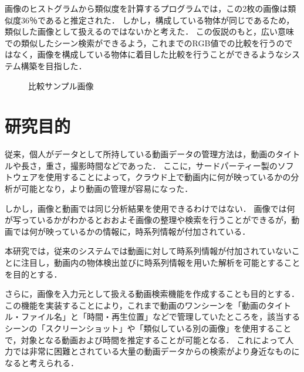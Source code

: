 \documentclass[a4j,12pt,dvipdfmx]{jreport}
\begin{document}
画像のヒストグラムから類似度を計算するプログラムでは，この2枚の画像は類似度36％であると推定された．
しかし，構成している物体が同じであるため，類似した画像として扱えるのではないかと考えた．
この仮説のもと，広い意味での類似したシーン検索ができるよう，これまでのRGB値での比較を行うのではなく，画像を構成している物体に着目した比較を行うことができるようなシステム構築を目指した．

\vspace{2zh}
\begin{figure}[H]
  \centering
  \caption{\label{fig:hikaku} 比較サンプル画像}
\end{figure}

\section{研究目的}
従来，個人がデータとして所持している動画データの管理方法は，動画のタイトルや長さ，重さ，撮影時間などであった．
ここに，サードパーティー製のソフトウェアを使用することによって，クラウド上で動画内に何が映っているかの分析が可能となり，より動画の管理が容易になった．

しかし，画像と動画では同じ分析結果を使用できるわけではない．
画像では何が写っているかがわかるとおおよそ画像の整理や検索を行うことができるが，動画では何が映っているかの情報に，時系列情報が付加されている．

本研究では，従来のシステムでは動画に対して時系列情報が付加されていないことに注目し，動画内の物体検出並びに時系列情報を用いた解析を可能とすることを目的とする．

さらに，画像を入力元として扱える動画検索機能を作成することも目的とする．
この機能を実装することにより，これまで動画のワンシーンを「動画のタイトル・ファイル名」と「時間・再生位置」などで管理していたところを，該当するシーンの「スクリーンショット」や「類似している別の画像」を使用することで，対象となる動画および時間を推定することが可能となる．
これによって人力では非常に困難とされている大量の動画データからの検索がより身近なものになると考えられる．
\end{document}
